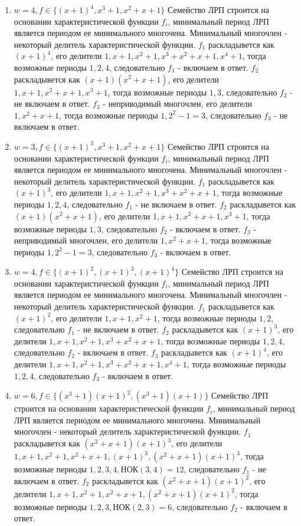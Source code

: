 \documentclass[12pt]{extarticle}
\begin{document}
\begin{enumerate}
    \item $w=4, f\in \{(x+1)^4, x^3+1, x^2+x+1\}$
    Семейство ЛРП строится на основании характеристической функции $f_i$, минимальный период ЛРП является периодом ее минимального многочена. Минимальный многочлен - некоторый делитель характеристической функции. $f_1$ раскладывется как $(x+1)^4$, его делители $1, x+1, x^2+1, x^3 +x^2+x + 1, x^4 +1$, тогда возможные периоды $1, 2, 4$, следовательно $f_1$ - включаем в ответ. $f_2$ раскладывется как $(x+1)(x^2+x+1)$, его делители $1, x+1, x^2+x+1, x^3+1$, тогда возможные периоды $1, 3$, следовательно $f_2$ - не включаем в ответ. $f_3$ - неприводимый многочлен, его делители $1, x^2+x+1$, тогда возможные периоды $1, 2^2-1=3$, следовательно $f_3$ - не включаем в ответ.
    
    \item $w=3, f\in \{(x+1)^3, x^3+1, x^2+x+1\}$
    Семейство ЛРП строится на основании характеристической функции $f_i$, минимальный период ЛРП является периодом ее минимального многочена. Минимальный многочлен - некоторый делитель характеристической функции. $f_1$ раскладывется как $(x+1)^3$, его делители $1, x+1, x^2+1, x^3 +x^2+x+ 1$, тогда возможные периоды $1, 2, 4$, следовательно $f_1$ - не включаем в ответ. $f_2$ раскладывется как $(x+1)(x^2+x+1)$, его делители $1, x+1, x^2+x+1, x^3+1$, тогда возможные периоды $1, 3$, следовательно $f_2$ - включаем в ответ. $f_3$ - неприводимый многочлен, его делители $1, x^2+x+1$, тогда возможные периоды $1, 2^2-1=3$, следовательно $f_3$ - включаем в ответ.
    
    \item $w=4, f\in \{(x+1)^2, (x+1)^3, (x+1)^4\}$
    Семейство ЛРП строится на основании характеристической функции $f_i$, минимальный период ЛРП является периодом ее минимального многочена. Минимальный многочлен - некоторый делитель характеристической функции. $f_1$ раскладывется как $(x+1)^2$, его делители $1, x+1, x^2+1$, тогда возможные периоды $1, 2$, следовательно $f_1$ - не включаем в ответ. $f_2$ раскладывется как $(x+1)^3$, его делители $1, x+1, x^2+1, x^3+x^2+x+1$, тогда возможные периоды $1, 2, 4$, следовательно $f_2$ - включаем в ответ. $f_3$ раскладывется как $(x+1)^4$, его делители $1, x+1, x^2+1, x^3 +x^2+x+ 1, x^4 +1$, тогда возможные периоды $1, 2, 4$, следовательно $f_3$ - включаем в ответ.
    
    \item $w=6, f\in \{(x^3+1)(x+1)^2, (x^3+1)(x+1)\}$
    Семейство ЛРП строится на основании характеристической функции $f_i$, минимальный период ЛРП является периодом ее минимального многочена. Минимальный многочлен - некоторый делитель характеристической функции. $f_1$ раскладывется как $(x^2+x+1)(x+1)^3$, его делители $1, x+1, x^2+1, x^2+x+1, (x+1)^3, (x^2+x+1)(x+1)^3$, тогда возможные периоды $1, 2, 3, 4, $НОК$(3,4)=12$, следовательно $f_1$ - не включаем в ответ. $f_2$ раскладывется как $(x^2+x+1)(x+1)^2$, его делители $1, x+1, x^2+1, x^2+x+1, (x^2+x+1)(x+1)^2$, тогда возможные периоды $1, 2, 3, $НОК$(2,3)=6$, следовательно $f_2$ - включаем в ответ.
    

\end{enumerate}
\end{document}
